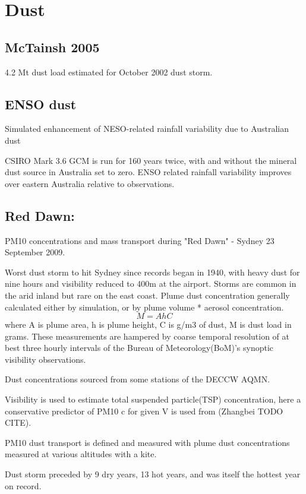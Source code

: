 \section{Dust}

\subsection{McTainsh 2005}
4.2 Mt dust load estimated for October 2002 dust storm.

\subsection{ENSO dust \cite{Rotstayn_2011}}
Simulated enhancement of NESO-related rainfall variability due to Australian dust

CSIRO Mark 3.6 GCM is run for 160 years twice, with and without the mineral dust source in Australia set to zero.
ENSO related rainfall variability improves over eastern Australia relative to observations.

\subsection{Red Dawn: \cite{Leys_2011}}
PM10 concentrations and mass transport during "Red Dawn" - Sydney 23 September 2009.

Worst dust storm to hit Sydney since records began in 1940, with heavy dust for nine hours and visibility reduced to 400m at the airport.
Storms are common in the arid inland but rare on the east coast.
Plume dust concentration generally calculated either by simulation, or by plume volume * aerosol concentration.
$$M = AhC$$ 
where A is plume area, h is plume height, C is g/m3 of dust, M is dust load in grams.
These measurements are hampered by coarse temporal resolution of at best three hourly intervals of the Bureau of Meteorology(BoM)'s synoptic visibility observations.

Dust concentrations sourced from some stations of the DECCW AQMN.

Visibility is used to estimate total suspended particle(TSP) concentration, here a conservative predictor of PM10 c for given V is used from (Zhangbei TODO CITE).

PM10 dust transport is defined and measured with plume dust concentrations measured at various altitudes with a kite. 

Dust storm preceded by 9 dry years, 13 hot years, and was itself the hottest year on record.

